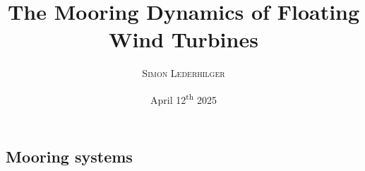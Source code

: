 \documentclass{article}
\title{The Mooring Dynamics of Floating Wind Turbines}
\subtitle{\emph{\headcourse}}
\author{\textsc{Simon Lederhilger}}
\date{April 12\textsuperscript{th} 2025}
\begin{document}
\maketitle\thispagestyle{fancy}
    \begin{multicols*}{2}
        \section[Mooring]{Mooring systems}
        
    \end{multicols*}
\end{document}
